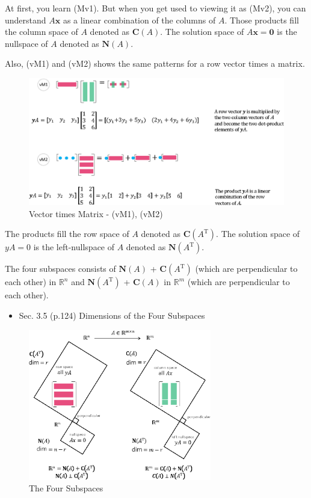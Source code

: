 \documentclass[letterpaper]{article}
\DeclareRobustCommand\transp{^{\mathrm{T}}}
\begin{document}
At first, you learn (Mv1). But when you get used to viewing it as (Mv2),
you can understand $A\bm{x}$ as a linear combination of the columns of $A$.
Those products fill the column space of $A$  denoted as $\mathbf{C}(A)$.
The solution space of $A\bm{x}=\bm{0}$ is the nullspace of $A$ denoted as $\mathbf{N}(A)$.

Also, (vM1) and (vM2) shows the same patterns for a row vector times a matrix.

\begin{figure}[H]
  \centering
  \includegraphics[scale=0.8]{VectorTimesMatrix.eps}
  \caption{Vector times Matrix - (vM1), (vM2)}
\end{figure}


The products fill the row space of $A$ denoted as $\mathbf{C}(A\transp)$.
The solution space of $yA=0$ is the left-nullspace of $A$ denoted as $\mathbf{N}(A\transp)$.


The four subspaces consists of $\mathbf{N}(A)$ + $\mathbf{C}(A\transp)$ 
(which are perpendicular to each other) in $\mathbb{R}^n$ and
$\mathbf{N}(A\transp)$ + $\mathbf{C}(A)$ in $\mathbb{R}^m$
(which are perpendicular to each other).


\begin{itemize}
  \item Sec. 3.5 (p.124) Dimensions of the Four Subspaces
\end{itemize} 

\begin{figure}[H]
  \centering
  \includegraphics[keepaspectratio, width=8cm]{4-Subspaces.eps}
  \caption{The Four Subspaces}
\end{figure}
\end{document}

